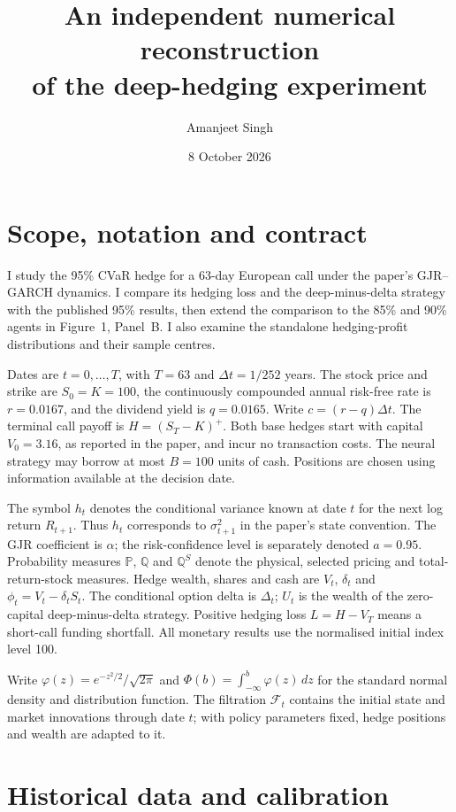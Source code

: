 \documentclass[11pt,a4paper]{article}
\title{An independent numerical reconstruction\\of the deep-hedging experiment}
\author{Amanjeet Singh}
\date{8 October 2026}
\newcommand{\Pp}{\mathbb P}
\newcommand{\Q}{\mathbb Q}
\newcommand{\F}{\mathcal F}
\newcommand{\dt}{\Delta t}
\theoremstyle{remark}
\begin{document}
\maketitle
\vspace{-1.5em}
\section{Scope, notation and contract}
I study the 95\% CVaR hedge for a 63-day European call under the paper's GJR--GARCH dynamics. I compare its hedging loss and the deep-minus-delta strategy with the published 95\% results, then extend the comparison to the 85\% and 90\% agents in Figure~1, Panel~B. I also examine the standalone hedging-profit distributions and their sample centres.

Dates are $t=0,\ldots,T$, with $T=63$ and $\dt=1/252$ years. The stock price and strike are $S_0=K=100$, the continuously compounded annual risk-free rate is $r=0.0167$, and the dividend yield is $q=0.0165$. Write $c=(r-q)\dt$. The terminal call payoff is $H=(S_T-K)^+$. Both base hedges start with capital $V_0=3.16$, as reported in the paper, and incur no transaction costs. The neural strategy may borrow at most $B=100$ units of cash. Positions are chosen using information available at the decision date.

The symbol $h_t$ denotes the conditional variance known at date $t$ for the next log return $R_{t+1}$. Thus $h_t$ corresponds to $\sigma_{t+1}^2$ in the paper's state convention. The GJR coefficient is $\alpha$; the risk-confidence level is separately denoted $a=0.95$. Probability measures $\Pp$, $\Q$ and $\Q^S$ denote the physical, selected pricing and total-return-stock measures. Hedge wealth, shares and cash are $V_t$, $\delta_t$ and $\phi_t=V_t-\delta_tS_t$. The conditional option delta is $\Delta_t$; $U_t$ is the wealth of the zero-capital deep-minus-delta strategy. Positive hedging loss $L=H-V_T$ means a short-call funding shortfall. All monetary results use the normalised initial index level 100.

Write $\varphi(z)=e^{-z^2/2}/\sqrt{2\pi}$ and $\Phi(b)=\int_{-\infty}^b\varphi(z)\,dz$ for the standard normal density and distribution function.
The filtration $\F_t$ contains the initial state and market innovations through date $t$; with policy parameters fixed, hedge positions and wealth are adapted to it.

\section{Historical data and calibration}
\end{document}
